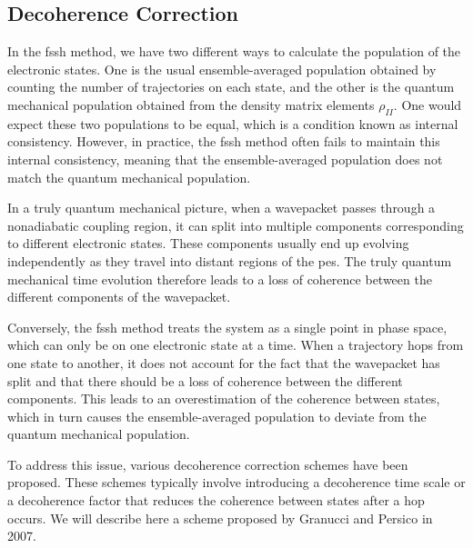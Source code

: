 \subsection{Decoherence Correction}
In the \gls{fssh} method, we have two different ways to calculate the population of the electronic states. One is the usual ensemble-averaged population obtained by counting the number of trajectories on each state, and the other is the quantum mechanical population obtained from the density matrix elements $\rho_{II}$. One would expect these two populations to be equal, which is a condition known as internal consistency. However, in practice, the \gls{fssh} method often fails to maintain this internal consistency, meaning that the ensemble-averaged population does not match the quantum mechanical population.\supercite{10.1063/1.474288,10.1063/1.1793991,10.1063/1.471791}

In a truly quantum mechanical picture, when a wavepacket passes through a nonadiabatic coupling region, it can split into multiple components corresponding to different electronic states. These components usually end up evolving independently as they travel into distant regions of the \gls{pes}. The truly quantum mechanical time evolution therefore leads to a loss of coherence between the different components of the wavepacket.

Conversely, the \gls{fssh} method treats the system as a single point in phase space, which can only be on one electronic state at a time. When a trajectory hops from one state to another, it does not account for the fact that the wavepacket has split and that there should be a loss of coherence between the different components. This leads to an overestimation of the coherence between states, which in turn causes the ensemble-averaged population to deviate from the quantum mechanical population.

To address this issue, various decoherence correction schemes have been proposed. These schemes typically involve introducing a decoherence time scale or a decoherence factor that reduces the coherence between states after a hop occurs.\supercite{10.1063/1.1793991,10.1021/acs.jctc.2c00988,10.1021/jp991602b} We will describe here a scheme proposed by Granucci and Persico in 2007.\supercite{10.1063/1.2715585}

